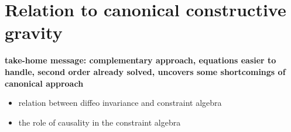 \chapter{Relation to canonical constructive gravity}

\textbf{take-home message: complementary approach, equations easier to handle, second order already solved, uncovers some shortcomings of canonical approach}

\begin{itemize}
\item relation between diffeo invariance and constraint algebra
\item the role of causality in the constraint algebra
\end{itemize}

